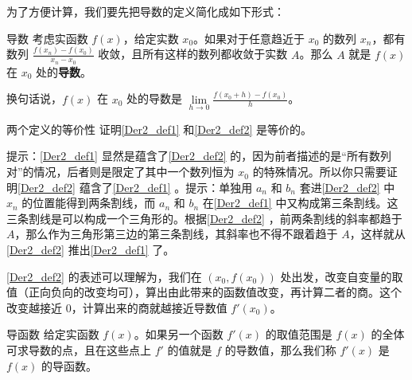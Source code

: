 



为了方便计算，我们要先把导数的定义简化成如下形式：

\begin{definition}{导数}\label{Der2_def2}
考虑实函数 $f(x)$，给定实数 $x_0$。如果对于任意趋近于 $x_0$ 的数列 $x_n$，都有数列 $\frac{f(x_n)-f(x_0)}{x_n-x_0}$ 收敛，且所有这样的数列都收敛于实数 $A$。那么 $A$ 就是 $f(x)$ 在 $x_0$ 处的\textbf{导数}。

换句话说，$f(x)$ 在 $x_0$ 处的导数是 $\lim\limits_{h\to 0}\frac{f(x_0+h)-f(x_0)}{h}$。
\end{definition}

\begin{exercise}{两个定义的等价性}
证明\autoref{Der2_def1} 和\autoref{Der2_def2} 是等价的。

提示：\autoref{Der2_def1} 显然是蕴含了\autoref{Der2_def2} 的，因为前者描述的是“所有数列对”的情况，后者则是限定了其中一个数列恒为 $x_0$ 的特殊情况。所以你只需要证明\autoref{Der2_def2} 蕴含了\autoref{Der2_def1} 。提示：单独用 $a_n$ 和 $b_n$ 套进\autoref{Der2_def2} 中 $x_n$ 的位置能得到两条割线，而 $a_n$ 和 $b_n$ 在\autoref{Der2_def1} 中又构成第三条割线。这三条割线是可以构成一个三角形的。根据\autoref{Der2_def2} ，前两条割线的斜率都趋于 $A$，那么作为三角形第三边的第三条割线，其斜率也不得不跟着趋于 $A$，这样就从\autoref{Der2_def2} 推出\autoref{Der2_def1} 了。
\end{exercise}


\autoref{Der2_def2} 的表述可以理解为，我们在 $(x_0, f(x_0))$ 处出发，改变自变量的取值（正向负向的改变均可），算出由此带来的函数值改变，再计算二者的商。这个改变越接近 $0$，计算出来的商就越接近导数值 $f'(x_0)$。

\begin{definition}{导函数}
给定实函数 $f(x)$。如果另一个函数 $f'(x)$ 的取值范围是 $f(x)$ 的全体可求导数的点，且在这些点上 $f'$ 的值就是 $f$ 的导数值，那么我们称 $f'(x)$ 是 $f(x)$ 的导函数。
\end{definition}

